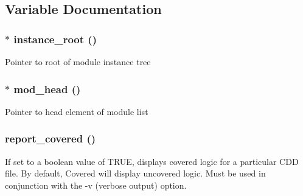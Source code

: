 \subsection{Variable Documentation}
\subsubsection{$\ast$ instance\_\-root ()}\label{toggle_8c_a0}


Pointer to root of module instance tree 
\subsubsection{$\ast$ mod\_\-head ()}\label{toggle_8c_a1}


Pointer to head element of module list 
\subsubsection{ report\_\-covered ()}\label{toggle_8c_a2}


If set to a boolean value of TRUE, displays covered logic for a particular CDD file. By default, Covered will display uncovered logic. Must be used in conjunction with the -v (verbose output) option. 